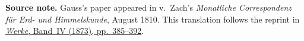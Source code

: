 \par\medskip\begin{small}\noindent\textbf{Source note.} Gauss's paper appeared in v.\ Zach's \textit{Monatliche Correspondenz für Erd- und Himmelskunde}, August 1810. This translation follows the reprint in \href{https://gdz.sub.uni-goettingen.de/id/PPN236005081}{\textit{Werke}, Band~IV (1873), pp.~385--392}.\par\end{small}
